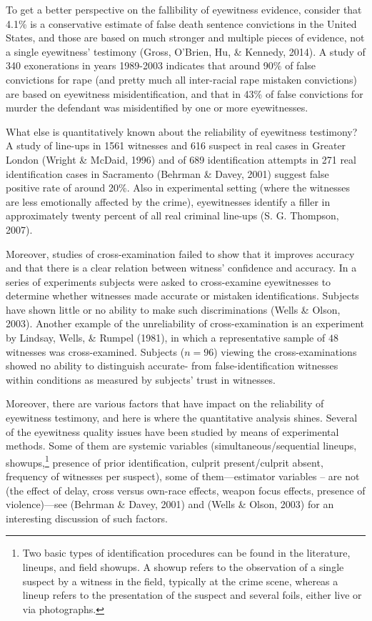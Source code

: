 \documentclass[
  10pt,
  dvipsnames,enabledeprecatedfontcommands]{scrartcl}
\begin{document}
To get a better perspective on the fallibility of eyewitness evidence,
consider that 4.1\% is a conservative estimate of false death sentence
convictions in the United States, and those are based on much stronger
and multiple pieces of evidence, not a single eyewitness' testimony
(Gross, O'Brien, Hu, \& Kennedy, 2014). A study of 340 exonerations in
years 1989-2003 indicates that around 90\% of false convictions for rape
(and pretty much all inter-racial rape mistaken convictions) are based
on eyewitness misidentification, and that in 43\% of false convictions
for murder the defendant was misidentified by one or more eyewitnesses.

What else is quantitatively known about the reliability of eyewitness
testimony? A study of line-ups in 1561 witnesses and 616 suspect in real
cases in Greater London (Wright \& McDaid, 1996) and of 689
identification attempts in 271 real identification cases in Sacramento
(Behrman \& Davey, 2001) suggest false positive rate of around 20\%.
Also in experimental setting (where the witnesses are less emotionally
affected by the crime), eyewitnesses identify a filler in approximately
twenty percent of all real criminal line-ups (S. G. Thompson, 2007).

Moreover, studies of cross-examination failed to show that it improves
accuracy and that there is a clear relation between witness' confidence
and accuracy. In a series of experiments subjects were asked to
cross-examine eyewitnesses to determine whether witnesses made accurate
or mistaken identifications. Subjects have shown little or no ability to
make such discriminations (Wells \& Olson, 2003). Another example of the
unreliability of cross-examination is an experiment by Lindsay, Wells,
\& Rumpel (1981), in which a representative sample of \(48\) witnesses
was cross-examined. Subjects (\(n = 96\)) viewing the cross-examinations
showed no ability to distinguish accurate- from false-identification
witnesses within conditions as measured by subjects' trust in witnesses.

Moreover, there are various factors that have impact on the reliability
of eyewitness testimony, and here is where the quantitative analysis
shines. Several of the eyewitness quality issues have been studied by
means of experimental methods. Some of them are systemic variables
(simultaneous/sequential lineups,
showups,\footnote{Two basic types of identification procedures can be found in the literature, lineups, and field showups. A showup refers to the observation of a single suspect by a witness in the field, typically at the crime scene, whereas a lineup refers to the presentation of the suspect and several foils, either live or via photographs.}
presence of prior identification, culprit present/culprit absent,
frequency of witnesses per suspect), some of them---estimator variables
-- are not (the effect of delay, cross versus own-race effects, weapon
focus effects, presence of violence)---see (Behrman \& Davey, 2001) and
(Wells \& Olson, 2003) for an interesting discussion of such factors.
\end{document}
